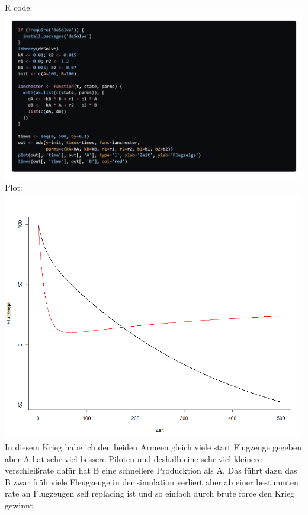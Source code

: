 \documentclass{scrartcl}
\begin{document}
R code:\\
\includegraphics*[scale=0.24]{Lanchester_R_code.png}\\
Plot:\\
\includegraphics*[scale=0.4]{Lanchester_Comabt_R.png}\\
In diesem Krieg habe ich den beiden Armeen gleich viele start Flugzeuge gegeben aber A hat sehr viel bessere Piloten und deshalb eine sehr viel kleinere verschleißrate dafür hat B eine schnellere Producktion als A. Das führt dazu das B zwar früh viele Fleugzeuge in der simulation verliert aber ab einer bestimmten rate an Flugzeugen self replacing ist und so einfach durch brute force den Krieg gewinnt.
\end{document}
